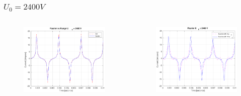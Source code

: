 \documentclass[aspectratio=1610]{beamer}
\begin{document}
\begin{frame}
\frametitle{$U_{0}= 2400V$}
	\begin{columns}
			\begin{figure}
				\includegraphics[scale=0.25]{figs/fourier vs rk4 2400.png}
			\end{figure}
			\begin{figure}
				\includegraphics[scale=0.25]{figs/fourier comparison 2400.png}
			\end{figure}
	\end{columns}
\end{frame}
\end{document}
